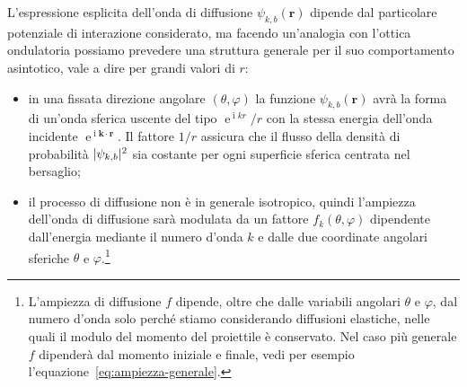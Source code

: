 \documentclass[a4paper,fleqn,twoside,12pt]{article}
\renewcommand{\phi}{\varphi}
\DeclareMathOperator{\e}{\mathrm{e}} %
\DeclareMathOperator{\uimm}{\mathrm{i}} %
\DeclarePairedDelimiter{\abs}{\lvert}{\rvert}
\begin{document}
L'espressione esplicita dell'onda di diffusione $\psi_{k,b}(\bm{r})$ dipende dal
particolare potenziale di interazione considerato, ma facendo un'analogia con
l'ottica ondulatoria possiamo prevedere una struttura generale per il suo
comportamento asintotico, vale a dire per grandi valori di $r$:
\begin{itemize}
\item in una fissata direzione angolare $(\theta, \phi)$ la funzione
  $\psi_{k,b}(\bm{r})$ avrà la forma di un'onda sferica uscente del tipo
  $\e^{\uimm kr}/r$ con la stessa energia dell'onda incidente
  $\e^{\uimm \bm{k}\cdot\bm{r}}$.  Il fattore $1/r$ assicura che il flusso della
  densità di probabilità $\abs{\psi_{k,b}}^{2}$ sia costante per ogni superficie
  sferica centrata nel bersaglio;
\item il processo di diffusione non è in generale isotropico, quindi l'ampiezza
  dell'onda di diffusione sarà modulata da un fattore $f_{k}(\theta,\phi)$
  dipendente dall'energia mediante il numero d'onda $k$ e dalle due coordinate
  angolari sferiche $\theta$ e
  $\phi$.\footnote{L'ampiezza di diffusione $f$ dipende, oltre che dalle
    variabili angolari $\theta$ e $\phi$, dal numero d'onda solo perché stiamo
    considerando diffusioni elastiche, nelle quali il modulo del momento del
    proiettile è conservato.  Nel caso più generale $f$ dipenderà dal momento
    iniziale e finale, vedi per esempio
    l'equazione~\eqref{eq:ampiezza-generale}.}
\end{itemize}
\end{document}
